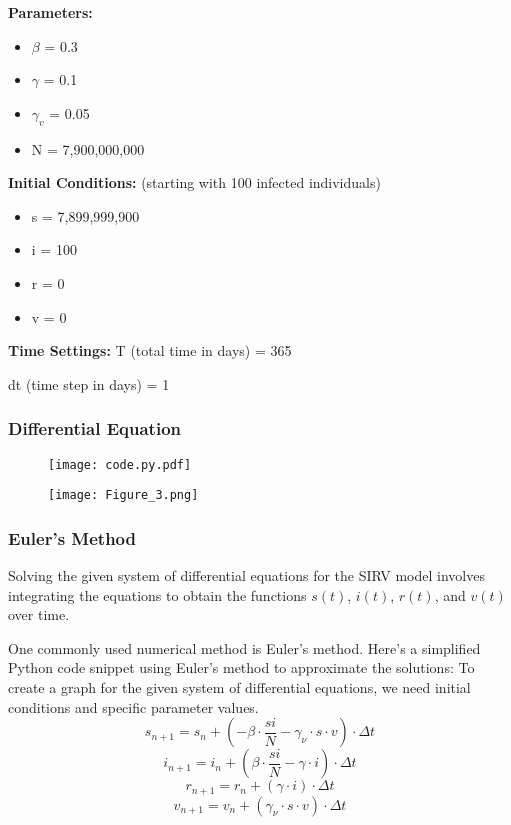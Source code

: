 \documentclass{beamer}
\let\olditem\item
\renewcommand{\item}{\setlength{\itemsep}{\fill}\olditem}
\begin{document}
\begin{frame}
\textbf{Parameters:}
\begin{itemize}
    \item $\beta$ = 0.3
    \item $\gamma$ = 0.1
    \item $\gamma_v$ = 0.05
    \item N = 7,900,000,000
\end{itemize}

\medskip

\textbf{Initial Conditions:} (starting with 100 infected individuals)
\begin{itemize}
    \item s = 7,899,999,900
    \item i = 100
    \item r = 0
    \item v = 0
\end{itemize}

\medskip

\textbf{Time Settings:}
T (total time in days) = 365

\smallskip

dt (time step in days) = 1
\end{frame}

\begin{frame}
\frametitle{Differential Equation}
\begin{figure}
\begin{center}
\texttt{[image: code.py.pdf]}
\end{center}
\end{figure}
\end{frame}

\begin{frame} 
\begin{figure}
\begin{center}
\texttt{[image: Figure\_3.png]}
\end{center}
\end{figure}
\end{frame}


\begin{frame}
\frametitle{Euler's Method}  
Solving the given system of differential equations for the SIRV model involves integrating the equations to obtain the functions \(s(t)\), \(i(t)\), \(r(t)\), and \(v(t)\) over time. 

One commonly used numerical method is Euler's method. Here's a simplified Python code snippet using Euler's method to approximate the solutions:
To create a graph for the given system of differential equations, we need initial conditions and specific parameter values. 
     \[s_{n+1} = s_n + \left(-\beta \cdot \frac{si}{N} - \gamma_{\nu} \cdot s \cdot v\right) \cdot \Delta t\]
     \[i_{n+1} = i_n + \left(\beta \cdot \frac{si}{N} - \gamma \cdot i\right) \cdot \Delta t\]
     \[r_{n+1} = r_n + \left(\gamma \cdot i\right) \cdot \Delta t\]
     \[v_{n+1} = v_n + \left(\gamma_{\nu} \cdot s \cdot v\right) \cdot \Delta t\]

\end{frame}
\end{document}
